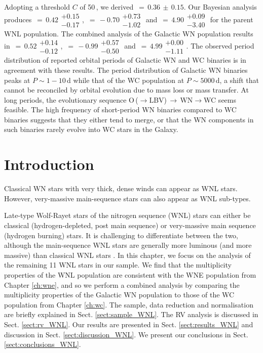 \begin{abs}
Adopting a threshold $C$ of 50\,\kms{}, we derived \fobsWNL{}$\,=\,0.36\,\pm\,0.15$. Our Bayesian analysis produces \fintWNL{}$\,=\,0.42\substack{+0.15 \\ -0.17}$, \piWNL{}$\,=\,-0.70\substack{+0.73 \\ -1.02}$ and \logPmaxWNL$\,=\,4.90\substack{+0.09 \\ -3.40}$ for the parent WNL population. The combined analysis of the Galactic WN population results in \fintWN{}$\,=\,0.52\substack{+0.14 \\ -0.12}$, \piWN{}$\,=\,-0.99\substack{+0.57 \\ -0.50}$ and \logPmaxWN$\,=\,4.99\substack{+0.00 \\ -1.11}$. The observed period distribution of reported orbital periods of Galactic WN and WC binaries is in agreement with these results.
The period distribution of Galactic WN binaries peaks at $P{\sim}1-10\,$d while that of the WC population at $P{\sim}5000\,$d, a shift that cannot be reconciled by orbital evolution due to mass loss or mass transfer.
At long periods, the evolutionary sequence O\,($\xrightarrow{}$LBV)\,$\xrightarrow{}$\,WN$\xrightarrow{}$WC seems feasible. The high frequency of short-period WN binaries compared to WC binaries suggests that they either tend to merge, or that the WN components in such binaries rarely evolve into WC stars in the Galaxy.
\end{abs}


\section{Introduction}

Classical WN stars with very thick, dense winds can appear as WNL stars. However, very-massive main-sequence stars can also appear as WNL sub-types.

Late-type Wolf-Rayet stars of the nitrogen sequence (WNL) stars can either be classical (hydrogen-depleted, post main sequence) or very-massive main sequence (hydrogen burning) stars. It is challenging to differentiate between the two, although the main-sequence WNL stars are generally more luminous (and more massive) than classical WNL stars \citep{hamann_galactic_2019}. In this chapter, we focus on the analysis of the remaining 11 WNL stars in our sample. We find that the multiplicity properties of the WNL population are consistent with the WNE population from Chapter \ref{ch:wne}, and so we perform a combined analysis by comparing the multiplicity properties of the Galactic WN population to those of the WC population from Chapter \ref{ch:wc}. The sample, data reduction and normalisation are briefly explained in Sect. \ref{sect:sample_WNL}. The RV analysis is discussed in Sect. \ref{sect:rv_WNL}. Our results are presented in Sect. \ref{sect:results_WNL} and discussion in Sect. \ref{sect:discussion_WNL}. We present our conclusions in Sect. \ref{sect:conclusions_WNL}.


